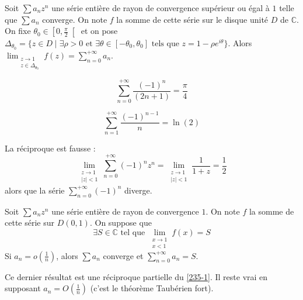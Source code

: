 
  \begin{theorem}
    \label{235-1}
    Soit $\sum a_n z^n$ une série entière de rayon de convergence supérieur ou égal à $1$ telle que $\sum a_n$ converge. On note $f$ la somme de cette série sur le disque unité $D$ de $\mathbb{C}$. On fixe $\theta_0 \in \left[ 0, \frac{\pi}{2} \right[$ et on pose $\Delta_{\theta_0} = \{ z \in D \mid \exists \rho > 0 \text{ et } \exists \theta \in [-\theta_0, \theta_0] \text{ tels que } z = 1 - \rho e^{i\theta} \}$.
    \newpar
    Alors $\lim_{\substack{z \rightarrow 1 \\ z \in \Delta_{\theta_0}}} f(z) = \sum_{n=0}^{+\infty} a_n$.
  \end{theorem}

  \begin{application}
    \[ \sum_{n=0}^{+\infty} \frac{(-1)^n}{(2n+1)} = \frac{\pi}{4} \]
  \end{application}

  \begin{application}
    \[ \sum_{n=1}^{+\infty} \frac{(-1)^{n-1}}{n} = \ln(2) \]
  \end{application}

  \begin{cexample}
    La réciproque est fausse :
    \[ \lim_{\substack{z \rightarrow 1 \\ \vert z \vert < 1}} \sum_{n=0}^{+\infty} (-1)^n z^n = \lim_{\substack{z \rightarrow 1 \\ \vert z \vert < 1}} \frac{1}{1+z} = \frac{1}{2} \]
    alors que la série $\sum_{n=0}^{+\infty} (-1)^n$ diverge.
  \end{cexample}

  \begin{theorem}
    Soit $\sum a_n z^n$ une série entière de rayon de convergence $1$. On note $f$ la somme de cette série sur $D(0,1)$. On suppose que
    \[ \exists S \in \mathbb{C} \text{ tel que } \lim_{\substack{x \rightarrow 1 \\ x < 1}} f(x) = S \]
    Si $a_n = o \left( \frac{1}{n} \right)$, alors $\sum a_n$ converge et $\sum_{n=0}^{+\infty} a_n = S$.
  \end{theorem}

  \begin{remark}
    Ce dernier résultat est une réciproque partielle du \cref{235-1}. Il reste vrai en supposant $a_n = O \left( \frac{1}{n} \right)$ (c'est le théorème Taubérien fort).
  \end{remark}

